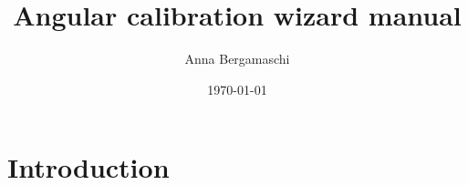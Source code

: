 \documentclass{article}
\begin{document}
\title{Angular calibration wizard manual}
\author{Anna Bergamaschi}
\date{\today}
\maketitle


\section{Introduction}

\end{document}
